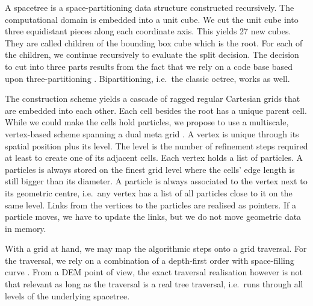 \documentclass[times,12pt]{article}
\begin{document}
A spacetree is a space-partitioning data structure constructed recursively.
The computational domain is embedded into a unit cube.
We cut the unit cube into three equidistant pieces along each coordinate axis. 
This yields 27 new cubes. 
They are called children of the bounding box cube which is the root.
For each of the children, we continue recursively to evaluate the split
decision. 
The decision to cut into three parts results from the fact that we rely on a
code base based upon three-partitioning \cite{Software:Peano}.
Bipartitioning, i.e.~the classic octree, works as well.

The construction scheme yields a cascade of ragged regular Cartesian grids that
are embedded into each other.
Each cell besides the root has a unique parent cell.
While we could make the cells hold particles, we propose to use a
multiscale, vertex-based scheme spanning a dual meta grid
\cite{Weinzierl:16:PIC}.
A vertex is unique through its spatial position plus its level. 
The level is the number of refinement steps required at least to create one of
its adjacent cells.
Each vertex holds a list of particles.
A particles is always stored on the finest grid level where the cells' edge
length is still bigger than its diameter.
A particle is always associated to the vertex next to its geometric centre,
i.e.~any vertex has a list of all particles close to it on the same level.
Links from the vertices to the particles are realised as pointers. 
If a particle moves, we have to update the links, but we do not move
geometric data in memory.

With a grid at hand, we may map the algorithmic steps onto a grid traversal.
For the traversal, we rely on a combination of a depth-first order with
space-filling curve \cite{Weinzierl:2009:Diss,Weinzierl:11:Peano}.
From a DEM point of view, the exact traversal realisation however is not that
relevant as long as the traversal is a real tree traversal, i.e.~runs through
all levels of the underlying spacetree.
\end{document}

